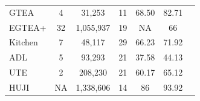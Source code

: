 \documentclass[landscape,a0paper,fontscale=0.292]{baposter}
\begin{document}
\begin{poster}
{\begin{center}
\begin{tabular}{l c c c c c c}
       \cmidrule{1-6}
       GTEA \cite{fathi2011learning} & 4 & 31,253 & 11 & 68.50\cite{suriya2016cvpr} & 82.71 & \\
       EGTEA+ \cite{fathi2011learning} & 32 & 1,055,937 & 19 & NA & 66 & \\
       Kitchen \cite{spriggs2009temporal} & 7 & 48,117 & 29 & 66.23\cite{suriya2016cvpr} & 71.92 & \\
       ADL \cite{pirsiavash2012detecting} & 5 & 93,293 & 21 & 37.58\cite{suriya2016cvpr} & 44.13 & \\
       UTE \cite{lee2012discovering} & 2 & 208,230 & 21 & 60.17\cite{suriya2016cvpr} & 65.12 & \\
       HUJI \cite{poleg2016compact} & NA & 1,338,606 & 14 & 86\cite{poleg2016compact} & 93.92 & \\
       \cmidrule{1-6}
    \end{tabular}
    \end{center}



}
\end{poster}
\end{document}
